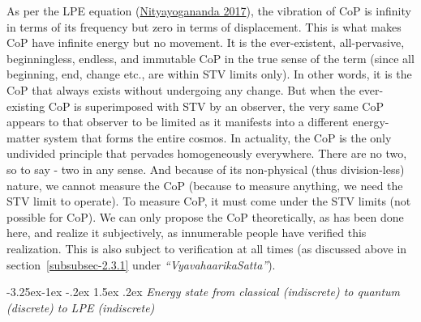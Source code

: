 \documentclass[twoside, 13pt]{article}
\makeatletter
\renewcommand\subsection{\@startsection{subsection}{2}{\z@}%
                                     {-3.25ex\@plus -1ex \@minus -.2ex}%
                                     {1.5ex \@plus .2ex}%
                                     {\normalfont\Large\bfseries}}
\makeatother
\begin{document}
{{As per the LPE equation (\underline{Nityayogananda 2017}), the vibration of CoP is infinity in terms of its frequency but zero in terms of displacement. This is what makes CoP have infinite energy but no movement. It is the ever-existent, all-pervasive, beginningless, endless, and immutable CoP in the true sense of the term (since all beginning, end, change etc., are within STV limits only). In other words, it is the CoP that always exists without undergoing any change. But when the ever-existing CoP is superimposed with STV by an observer, the very same CoP appears to that observer to be limited as it manifests into a different energy-matter system that forms the entire cosmos. In actuality, the CoP is the only undivided principle that pervades homogeneously everywhere. There are no two, so to say - two in any sense. And because of its non-physical (thus division-less) nature, we cannot measure the CoP (because to measure anything, we need the STV limit to operate). To measure CoP, it must come under the STV limits (not possible for CoP). We can only propose the CoP theoretically, as has been done here, and realize it subjectively, as innumerable people have verified this realization. This is also subject to verification at all times (as discussed above in section~\ref{subsubsec-2.3.1} under \textit{“VyavahaarikaSatta”}).}


{\fontsize{8}{10}\selectfont\subsection{\textit{Energy state from classical (indiscrete) to quantum\\ (discrete) to LPE (indiscrete)}}}\label{subsec-3.3}


}
\end{document}
